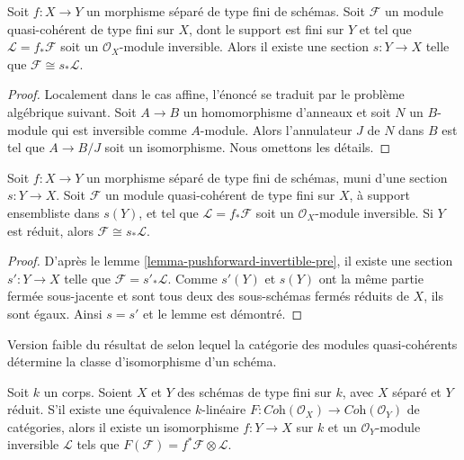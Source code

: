 \begin{lemma}
\label{lemma-pushforward-invertible-pre}
Soit $f : X \to Y$ un morphisme séparé de type fini de schémas. Soit
$\mathcal{F}$ un module quasi-cohérent de type fini sur $X$, dont le support
est fini sur $Y$ et tel que $\mathcal{L} = f_*\mathcal{F}$ soit un
$\mathcal{O}_X$-module inversible. Alors il existe une section
$s : Y \to X$ telle que $\mathcal{F} \cong s_*\mathcal{L}$.
\end{lemma}

\begin{proof}
Localement dans le cas affine, l'énoncé se traduit par le problème algébrique
suivant. Soit $A \to B$ un homomorphisme d'anneaux et soit $N$ un $B$-module
qui est inversible comme $A$-module. Alors l'annulateur $J$ de $N$ dans $B$
est tel que $A \to B/J$ soit un isomorphisme. Nous omettons les détails.
\end{proof}

\begin{lemma}
\label{lemma-pushforward-invertible}
Soit $f : X \to Y$ un morphisme séparé de type fini de schémas, muni d'une
section $s : Y \to X$. Soit $\mathcal{F}$ un module quasi-cohérent de type
fini sur $X$, à support ensembliste dans $s(Y)$, et tel que
$\mathcal{L} = f_*\mathcal{F}$ soit un $\mathcal{O}_X$-module inversible.
Si $Y$ est réduit, alors $\mathcal{F} \cong s_*\mathcal{L}$.
\end{lemma}

\begin{proof}
D'après le lemme \ref{lemma-pushforward-invertible-pre}, il existe une section
$s' : Y  \to X$ telle que $\mathcal{F} = s'_*\mathcal{L}$. Comme $s'(Y)$
et $s(Y)$ ont la même partie fermée sous-jacente et sont tous deux des
sous-schémas fermés réduits de $X$, ils sont égaux.
Ainsi $s = s'$ et le lemme est démontré.
\end{proof}

\begin{lemma}
\label{lemma-equivalence-coherent-over-field}
\begin{reference}
Version faible du résultat de \cite{Gabriel} selon lequel la catégorie des
modules quasi-cohérents détermine la classe d'isomorphisme d'un schéma.
\end{reference}
Soit $k$ un corps. Soient $X$ et $Y$ des schémas de type fini sur $k$,
avec $X$ séparé et $Y$ réduit. S'il existe une équivalence $k$-linéaire
$F : \textit{Coh}(\mathcal{O}_X) \to \textit{Coh}(\mathcal{O}_Y)$
de catégories, alors il existe un isomorphisme $f : Y \to X$ sur $k$ et un
$\mathcal{O}_Y$-module inversible $\mathcal{L}$ tels que
$F(\mathcal{F}) = f^*\mathcal{F} \otimes \mathcal{L}$.
\end{lemma}

